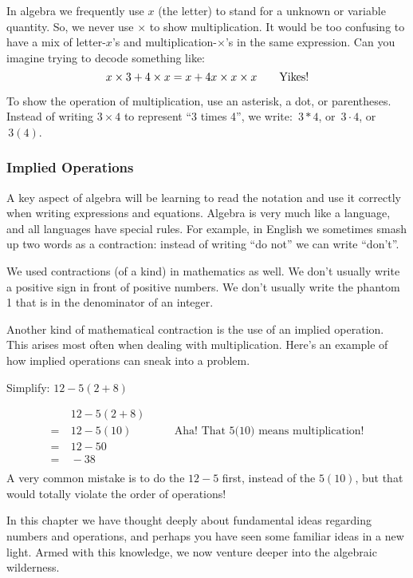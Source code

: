 In algebra we frequently use $x$ (the letter) to stand for a unknown or variable quantity. So, we never use $\times$ to show multiplication. It would be too confusing to have a mix of letter-$x$'s and multiplication-$\times$'s in the same expression. Can you imagine trying to decode something like: \[x \times 3 + 4 \times x = x + 4 x \times x \times x \text{\qquad Yikes!}\]

\begin{boxedwarning}
To show the operation of multiplication, use an asterisk, a dot, or parentheses. Instead of writing $3\times 4$ to represent ``3 times 4'', we write: $\,3 \ast 4$, or $\,3 \cdot 4$, or $\,3(4)$.
\end{boxedwarning}

\subsubsection{Implied Operations}

A key aspect of algebra will be learning to read the notation and use it correctly when writing expressions and equations. Algebra is very much like a language, and all languages have special rules. For example, in English we sometimes smash up two words as a contraction: instead of writing ``do not'' we can write ``don't''.

We used contractions (of a kind) in mathematics as well. We don't usually write a positive sign in front of positive numbers. We don't usually write the phantom 1 that is in the denominator of an integer.

Another kind of mathematical contraction is the use of an \gls{implied operation}. This arises most often when dealing with multiplication. Here's an example of how implied operations can sneak into a problem.

\begin{boxedex}
Simplify: $12 - 5(2 + 8)$

\exsoln{} 
\[\begin{aligned}
	&~ 12-5(2+8)\\
=	&~ 12-5(10)
&& \quad\text{Aha! That 5(10) means multiplication!}\\
=	&~ 12-50\\
=	&~ -38\\
\end{aligned}\]
A very common mistake is to do the $12-5$ first, instead of the $5(10)$, but that would totally violate the order of operations!
\end{boxedex}

In this chapter we have thought deeply about fundamental ideas regarding numbers and operations, and perhaps you have seen some familiar ideas in a new light. Armed with this knowledge, we now venture deeper into the algebraic wilderness.
